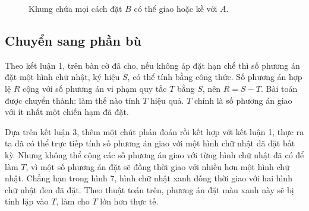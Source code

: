 \documentclass[11pt]{article}
\begin{document}
\setcounter{figure}{5}
\begin{figure}[htbp]
\centering
{}
\caption{Khung chứa mọi cách đặt \(B\) có thể giao hoặc kề với \(A\).}
\end{figure}

\subsection{Chuyển sang phần bù}

Theo kết luận 1, trên bàn cờ đã cho, nếu không áp đặt hạn chế thì số
phương án đặt một hình chữ nhật, ký hiệu \(S\), có thể tính bằng công
thức. Số phương án hợp lệ \(R\) cộng với số phương án vi phạm quy tắc
\(T\) bằng \(S\), nên \(R=S-T\). Bài toán được chuyển thành: làm thế nào
tính \(T\) hiệu quả. \(T\) chính là số phương án giao với ít nhất một
chiến hạm đã đặt.

Dựa trên kết luận 3, thêm một chút phán đoán rồi kết hợp với kết luận 1,
thực ra ta đã có thể trực tiếp tính số phương án giao với một hình chữ
nhật đã đặt bất kỳ. Nhưng không thể cộng các số phương án giao với từng
hình chữ nhật đã có để làm \(T\), vì một số phương án đặt sẽ đồng thời
giao với nhiều hơn một hình chữ nhật. Chẳng hạn trong hình 7, hình chữ
nhật xanh đồng thời giao với hai hình chữ nhật đen đã đặt. Theo thuật
toán trên, phương án đặt màu xanh này sẽ bị tính lặp vào \(T\), làm cho
\(T\) lớn hơn thực tế.
\end{document}
